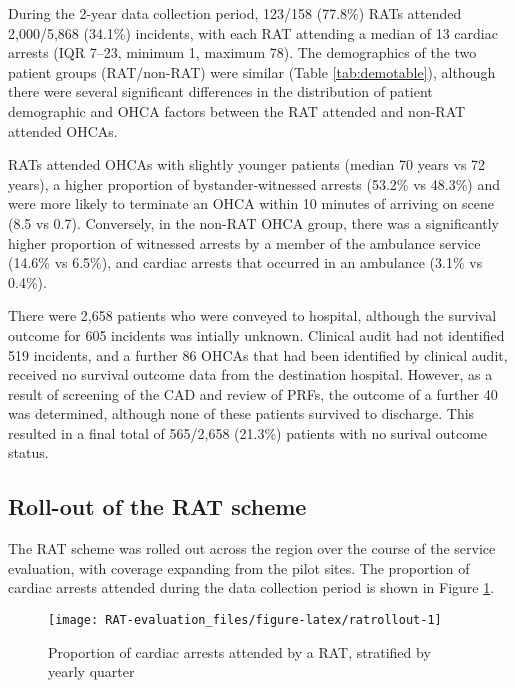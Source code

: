 \documentclass[]{article}
\theoremstyle{definition}
\theoremstyle{definition}
\theoremstyle{definition}
\theoremstyle{remark}
\begin{document}
During the 2-year data collection period, 123/158 (77.8\%) RATs attended
2,000/5,868 (34.1\%) incidents, with each RAT attending a median of 13
cardiac arrests (IQR 7--23, minimum 1, maximum 78). The demographics of
the two patient groups (RAT/non-RAT) were similar (Table
\ref{tab:demotable}), although there were several significant
differences in the distribution of patient demographic and OHCA factors
between the RAT attended and non-RAT attended OHCAs.

RATs attended OHCAs with slightly younger patients (median 70 years vs
72 years), a higher proportion of bystander-witnessed arrests (53.2\% vs
48.3\%) and were more likely to terminate an OHCA within 10 minutes of
arriving on scene (8.5 vs 0.7). Conversely, in the non-RAT OHCA group,
there was a significantly higher proportion of witnessed arrests by a
member of the ambulance service (14.6\% vs 6.5\%), and cardiac arrests
that occurred in an ambulance (3.1\% vs 0.4\%).

There were 2,658 patients who were conveyed to hospital, although the
survival outcome for 605 incidents was intially unknown. Clinical audit
had not identified 519 incidents, and a further 86 OHCAs that had been
identified by clinical audit, received no survival outcome data from the
destination hospital. However, as a result of screening of the CAD and
review of PRFs, the outcome of a further 40 was determined, although
none of these patients survived to discharge. This resulted in a final
total of 565/2,658 (21.3\%) patients with no surival outcome status.

\hypertarget{roll-out-of-the-rat-scheme}{%
\subsection{Roll-out of the RAT
scheme}\label{roll-out-of-the-rat-scheme}}

The RAT scheme was rolled out across the region over the course of the
service evaluation, with coverage expanding from the pilot sites. The
proportion of cardiac arrests attended during the data collection period
is shown in Figure \ref{fig:ratrollout}.

\begin{figure}
\texttt{[image: RAT-evaluation\_files/figure-latex/ratrollout-1]} \caption{Proportion of cardiac arrests attended by a RAT, stratified by yearly quarter}\label{fig:ratrollout}
\end{figure}
\end{document}
